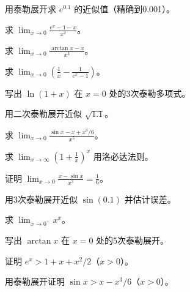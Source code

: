 \begin{exercise}[3] 用泰勒展开求 \(e^{0.1}\) 的近似值（精确到0.001）。\end{exercise}
\begin{exercise}[4] 求 \(\lim_{x\to0}\frac{e^x-1-x}{x^2}\)。\end{exercise}
\begin{exercise}[4] 求 \(\lim_{x\to0}\frac{\arctan x - x}{x^3}\)。\end{exercise}
\begin{exercise}[4] 求 \(\lim_{x\to0}\left(\frac{1}{x} - \frac{1}{e^x-1}\right)\)。\end{exercise}
\begin{exercise}[4] 写出 \(\ln(1+x)\) 在 \(x=0\) 处的3次泰勒多项式。\end{exercise}
\begin{exercise}[4] 用二次泰勒展开近似 \(\sqrt{1.1}\)。\end{exercise}
\begin{exercise}[5] 求 \(\lim_{x\to0}\frac{\sin x - x + x^3/6}{x^5}\)。\end{exercise}
\begin{exercise}[5] 求 \(\lim_{x\to\infty}\left(1+\frac{1}{x}\right)^x\) 用洛必达法则。\end{exercise}
\begin{exercise}[5] 证明 \(\lim_{x\to0}\frac{x-\sin x}{x^3}=\frac16\)。\end{exercise}
\begin{exercise}[5] 用3次泰勒展开近似 \(\sin(0.1)\) 并估计误差。\end{exercise}
\begin{exercise}[6] 求 \(\lim_{x\to0^+} x^x\)。\end{exercise}
\begin{exercise}[6] 写出 \(\arctan x\) 在 \(x=0\) 处的5次泰勒展开。\end{exercise}
\begin{exercise}[6] 证明 \(e^x > 1 + x + x^2/2\)（\(x>0\)）。\end{exercise}
\begin{exercise}[7] 用泰勒展开证明 \(\sin x > x - x^3/6\)（\(x>0\)）。\end{exercise}
